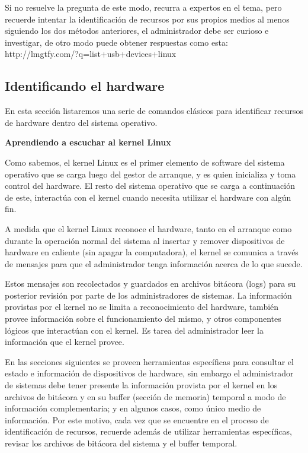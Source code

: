 \documentclass[12pt]{article}
\begin{document}
Si no resuelve la pregunta de este modo, recurra a expertos en el tema, pero recuerde
intentar la identificación de recursos por sus propios medios al menos siguiendo los dos 
métodos anteriores, el administrador debe ser curioso e investigar, de otro modo puede 
obtener respuestas como esta: http://lmgtfy.com/?q=list+usb+devices+linux

\subsection*{Identificando el hardware}
En esta sección listaremos una serie de comandos clásicos para identificar recursos de
hardware dentro del sistema operativo. 

\textbf{Aprendiendo a escuchar al kernel Linux}

Como sabemos, el kernel Linux es el primer elemento de software del sistema operativo 
que se carga luego del gestor de arranque, y es quien inicializa y toma control del hardware. 
El resto del sistema operativo que se carga a continuación de este, interactúa con el kernel 
cuando necesita utilizar el hardware con algún fin. 

A medida que el kernel Linux reconoce el hardware, tanto en el arranque como durante la 
operación normal del sistema al insertar y remover dispositivos de hardware 
en caliente (sin apagar la computadora), el kernel se comunica a través de mensajes para 
que el administrador tenga información acerca de lo que sucede. 

Estos mensajes son recolectados y guardados en archivos bitácora (logs) para su posterior 
revisión por parte de los administradores de sistemas. 
La información provistas por el kernel no se limita a reconocimiento del hardware, también 
provee información sobre el funcionamiento del mismo, y otros componentes lógicos que 
interactúan con el kernel. 
Es tarea del administrador leer la información que el kernel provee. 

En las secciones siguientes se proveen herramientas específicas para consultar el estado 
e información de dispositivos de hardware, sin embargo el administrador de sistemas debe
tener presente la información provista por el kernel en los archivos de bitácora y en su 
buffer (sección de memoria) temporal a modo de información complementaria; y en algunos 
casos, como único medio de información. Por este motivo, cada vez que se encuentre en el 
proceso de identificación de recursos, recuerde además de utilizar herramientas 
específicas, revisar los archivos de bitácora del sistema y el buffer temporal. 
\end{document}

